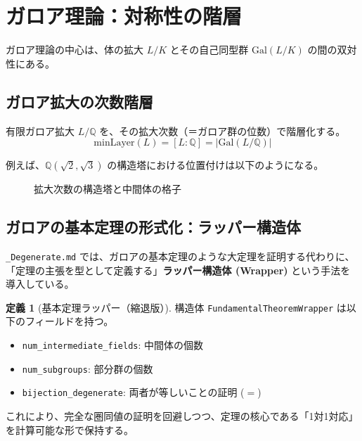 \documentclass[a4paper,11pt]{ltjsarticle}
\theoremstyle{definition}
\newtheorem{definition}{定義}[section]
\newcommand{\Z}{\mathbb{Z}}
\newcommand{\Q}{\mathbb{Q}}
\newcommand{\Gal}{\mathrm{Gal}}
\newcommand{\Layer}[1]{\mathrm{Layer}_{#1}}
\newcommand{\MinLayer}{\mathrm{minLayer}}
\begin{document}
\section{ガロア理論：対称性の階層}

ガロア理論の中心は、体の拡大 $L/K$ とその自己同型群 $\Gal(L/K)$ の間の双対性にある。

\subsection{ガロア拡大の次数階層}
有限ガロア拡大 $L/\Q$ を、その拡大次数（＝ガロア群の位数）で階層化する。
\[ \MinLayer(L) = [L:\Q] = |\Gal(L/\Q)| \]

例えば、$\Q(\sqrt{2}, \sqrt{3})$ の構造塔における位置付けは以下のようになる。

\begin{figure}[h]
\centering
{}
\caption{拡大次数の構造塔と中間体の格子}
\end{figure}

\subsection{ガロアの基本定理の形式化：ラッパー構造体}
\texttt{\_Degenerate.md} では、ガロアの基本定理のような大定理を証明する代わりに、「定理の主張を型として定義する」\textbf{ラッパー構造体 (Wrapper)} という手法を導入している。

\begin{definition}[基本定理ラッパー（縮退版）]
構造体 \texttt{FundamentalTheoremWrapper} は以下のフィールドを持つ。
\begin{itemize}
    \item \texttt{num\_intermediate\_fields}: 中間体の個数
    \item \texttt{num\_subgroups}: 部分群の個数
    \item \texttt{bijection\_degenerate}: 両者が等しいことの証明 ($=$)
\end{itemize}
これにより、完全な圏同値の証明を回避しつつ、定理の核心である「1対1対応」を計算可能な形で保持する。
\end{definition}
\end{document}
